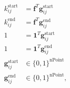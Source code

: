\begin{equation}\label{eqn:idxStart}\begin{aligned}
	k^{\text{start}}_{ij}        &= \mathbf{f}^T\mathbf{g}^{\text{start}}_{ij} \\
	k^{\text{end}}_{ij}         &= \mathbf{f}^T\mathbf{g}^{\text{end}}_{ij}  \\ 
	1                            &= \mathbf{1}^T\mathbf{g}^{\text{start}}_{ij} \\
	1                            &= \mathbf{1}^T\mathbf{g}^{\text{end}}_{ij}  \\
	\mathbf{g}^{\text{start}}_{ij}  &\in \{0,1\}^{\text{nPoint}}                \\
	\mathbf{g}^{\text{end}}_{ij} &\in \{0,1\}^{\text{nPoint}},
\end{aligned} \end{equation}

